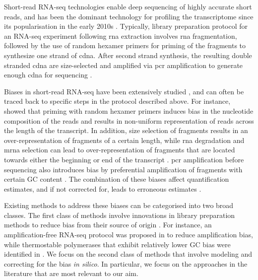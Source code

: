 Short-read RNA-seq technologies enable deep sequencing of highly accurate short reads, and has been the dominant technology for profiling the transcriptome since its popularisation in the early 2010s \cite{Lowe2017}. Typically, library preparation protocol for an RNA-seq experiment following \gls{rna} extraction involves \gls{rna} fragmentation, followed by the use of random hexamer primers for priming of the fragments to synthesize one strand of \gls{cdna}. After second strand synthesis, the resulting double stranded \gls{cdna} are size-selected and amplified via \gls{pcr} amplification to generate enough \gls{cdna} for sequencing \cite{Marguerat2010}.  

Biases in short-read RNA-seq have been extensively studied \cite{Hansen2010, Li2010, Li2011, Zhengpeng2010, Roberts2011, Benjamini2012, Lahens2014, Love2016}, and can often be traced back to specific steps in the protocol described above. For instance, \cite{Hansen2010} showed that priming with random hexamer primers induces bias in the nucleotide composition of the reads and results in non-uniform representation of reads across the length of the transcript. In addition, size selection of fragments results in an over-representation of fragments of a certain length, while \gls{rna} degradation and \gls{mrna} selection can lead to over-representation of fragments that are located towards either the beginning or end of the transcript \cite{Roberts2011, Lahens2014, Love2016}. \gls{pcr} amplification before sequencing also introduces bias by preferential amplification of fragments with certain GC content \cite{Benjamini2012, Love2016}. The combination of these biases affect quantification estimates, and if not corrected for, leads to erroneous estimates \cite{Roberts2011, Love2016}. 

Existing methods to address these biases can be categorised into two broad classes. The first class of methods involve innovations in library preparation methods to reduce bias from their source of origin \cite{Vandijk2014}. For instance, an amplification-free RNA-seq protocol was proposed in \cite{Mamanova2010} to reduce amplification bias, while thermostable polymerases that exhibit relatively lower GC bias were identified in \cite{Quail2012}. We focus on the second class of methods that involve modeling and correcting for the bias \textit{in silico}. In particular, we focus on the approaches in the literature that are most relevant to our aim. 

